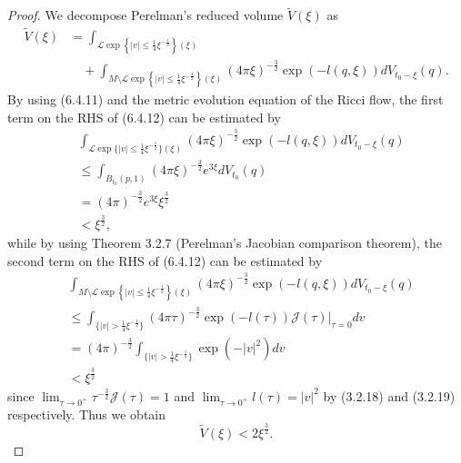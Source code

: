 \begin{proof}
We decompose Perelman's reduced volume $\widetilde{V}(\xi)$ as
\begin{align}
\widetilde{V}(\xi) &=\int_{\mathcal{L}\exp\left\{|v|
\le\frac{1}{4}\xi^{-\frac{1}{2}}\right\}(\xi)} \\
&\quad+\int_{M\setminus\mathcal{L}\exp\left\{|v|
\leq\frac{1}{4}\xi^{-\frac{1}{2}}\right\}(\xi)}(4\pi\xi)^{-\frac{3}{2}}
\exp(-l(q,\xi))dV_{t_0-\xi}(q). \nonumber%
\end{align}
By using (6.4.11) and the metric evolution equation of the Ricci
flow, the first term on the RHS of (6.4.12) can be estimated by
\begin{align*}
&
\int_{\mathcal{L}\exp\{|v|\le\frac{1}{4}\xi^{-\frac{1}{2}}\}(\xi)}
(4\pi\xi)^{-\frac{3}{2}}\exp(-l(q,\xi))dV_{t_0-\xi}(q)\\
&  \le\int_{B_{t_0}(p,1)}(4\pi\xi)^{-\frac{3}{2}}e^{3\xi}dV_{t_0}(q)\\
&  = (4\pi)^{-\frac{3}{2}}e^{3\xi}{\xi}^{\frac{3}{2}}\\
&  < \xi^\frac{3}{2},
\end{align*}
while by using Theorem 3.2.7 (Perelman's Jacobian comparison
theorem), the second term on the RHS of (6.4.12) can be estimated
by
\begin{align}
& \int_{M\setminus\mathcal{L}\exp
\left\{|v|\leq\frac{1}{4}\xi^{-\frac{1}{2}}\right\}(\xi)}
(4\pi\xi)^{-\frac{3}{2}}
\exp(-l(q,\xi))dV_{t_0-\xi}(q)\\
& \le\int_{\{|v|>\frac{1}{4}\xi^{-\frac{1}{2}}\}}
(4\pi\tau)^{-\frac{3}{2}}
\exp(-l(\tau))\mathcal{J}(\tau)|_{\tau=0}dv \nonumber\\
&  =
(4\pi)^{-\frac{3}{2}}\int_{\{|v|>\frac{1}{4}\xi^{-\frac{1}{2}}\}}
\exp(-|v|^2)dv \nonumber\\
&  < \xi^\frac{3}{2} \nonumber
\end{align}  %
since $\lim_{\tau\rightarrow
0^+}\tau^{-\frac{3}{2}}\mathcal{J}(\tau)=1$ and
$\lim_{\tau\rightarrow 0^+}l(\tau)=|v|^2$ by (3.2.18) and (3.2.19)
respectively. Thus we obtain \begin{equation}
\widetilde{V}(\xi)<2\xi^\frac{3}{2}. %
\end{equation}


\end{proof}
